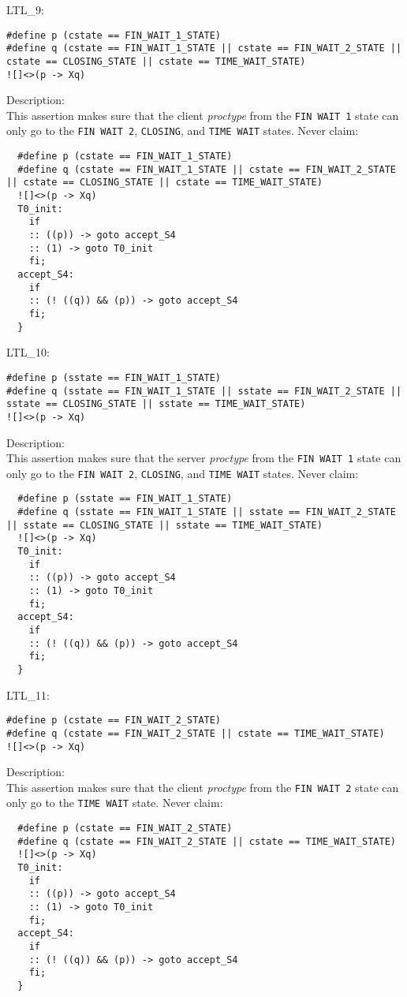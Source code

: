 \documentclass{WigReport}
\begin{document}
LTL\_9:\\
\begin{lstlisting}
#define p (cstate == FIN_WAIT_1_STATE)
#define q (cstate == FIN_WAIT_1_STATE || cstate == FIN_WAIT_2_STATE || cstate == CLOSING_STATE || cstate == TIME_WAIT_STATE)
![]<>(p -> Xq)
\end{lstlisting}
Description:\\
This assertion makes sure that the client \textit{proctype} from the \verb|FIN WAIT 1| state can only go to the \verb|FIN WAIT 2|, \verb|CLOSING|, and \verb|TIME WAIT| states.
Never claim:\\
\begin{lstlisting}
  #define p (cstate == FIN_WAIT_1_STATE)
  #define q (cstate == FIN_WAIT_1_STATE || cstate == FIN_WAIT_2_STATE || cstate == CLOSING_STATE || cstate == TIME_WAIT_STATE)
  ![]<>(p -> Xq)
  T0_init:
    if
    :: ((p)) -> goto accept_S4
    :: (1) -> goto T0_init
    fi;
  accept_S4:
    if
    :: (! ((q)) && (p)) -> goto accept_S4
    fi;
  }
\end{lstlisting}


LTL\_10:\\
\begin{lstlisting}
#define p (sstate == FIN_WAIT_1_STATE)
#define q (sstate == FIN_WAIT_1_STATE || sstate == FIN_WAIT_2_STATE || sstate == CLOSING_STATE || sstate == TIME_WAIT_STATE)
![]<>(p -> Xq)
\end{lstlisting}
Description:\\
This assertion makes sure that the server \textit{proctype} from the \verb|FIN WAIT 1| state can only go to the \verb|FIN WAIT 2|, \verb|CLOSING|, and \verb|TIME WAIT| states.
Never claim:\\
\begin{lstlisting}
  #define p (sstate == FIN_WAIT_1_STATE)
  #define q (sstate == FIN_WAIT_1_STATE || sstate == FIN_WAIT_2_STATE || sstate == CLOSING_STATE || sstate == TIME_WAIT_STATE)
  ![]<>(p -> Xq)
  T0_init:
    if
    :: ((p)) -> goto accept_S4
    :: (1) -> goto T0_init
    fi;
  accept_S4:
    if
    :: (! ((q)) && (p)) -> goto accept_S4
    fi;
  }
\end{lstlisting}


LTL\_11:\\
\begin{lstlisting}
#define p (cstate == FIN_WAIT_2_STATE)
#define q (cstate == FIN_WAIT_2_STATE || cstate == TIME_WAIT_STATE)
![]<>(p -> Xq)
\end{lstlisting}
Description:\\
This assertion makes sure that the client \textit{proctype} from the \verb|FIN WAIT 2| state can only go to the \verb|TIME WAIT| state.
Never claim:\\
\begin{lstlisting}
  #define p (cstate == FIN_WAIT_2_STATE)
  #define q (cstate == FIN_WAIT_2_STATE || cstate == TIME_WAIT_STATE)
  ![]<>(p -> Xq)
  T0_init:
    if
    :: ((p)) -> goto accept_S4
    :: (1) -> goto T0_init
    fi;
  accept_S4:
    if
    :: (! ((q)) && (p)) -> goto accept_S4
    fi;
  }
\end{lstlisting}
\end{document}
